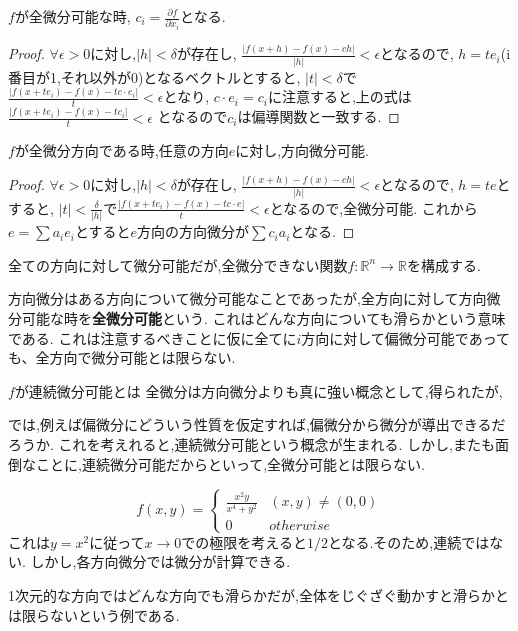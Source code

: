 \begin{prop}
  $f$が全微分可能な時,
  $c_i = \frac{\partial f}{\partial x_i}$となる.
\end{prop}
\begin{proof}
$\forall \epsilon >0$に対し,$|h| < \delta$が存在し,
$\frac{|f(x+h)-f(x) - ch|}{|h|} < \epsilon$となるので,
$h = te_i$(i番目が1,それ以外が0)となるベクトルとすると,
$|t| < \delta$で$\frac{|f(x+te_i)-f(x) - tc\cdot e_i|}{t} < \epsilon$となり,
$c \cdot e_i = c_i$に注意すると,上の式は$\frac{|f(x+te_i)-f(x) - tc_i|}{t} < \epsilon$
となるので$c_i$は偏導関数と一致する.
\end{proof}


\begin{prop}
  $f$が全微分方向である時,任意の方向$e$に対し,方向微分可能.
\end{prop}
\begin{proof}
$\forall \epsilon >0$に対し,$|h| < \delta$が存在し,
$\frac{|f(x+h)-f(x) - ch|}{|h|} < \epsilon$となるので,
$h = te$とすると,
$|t| < \frac{\delta}{|h|}$で$\frac{|f(x+te_i)-f(x) - tc \cdot e|}{t} < \epsilon$となるので,全微分可能.
これから$e = \sum a_i e_i$とすると$e$方向の方向微分が$\sum c_i a_i$となる.
\end{proof}

\begin{epl}
全ての方向に対して微分可能だが,全微分できない関数$f:\mathbb{R}^n \to \mathbb{R}$を構成する.
\end{epl}
方向微分はある方向について微分可能なことであったが,全方向に対して方向微分可能な時を\textbf{全微分可能}という.
これはどんな方向についても滑らかという意味である.
これは注意するべきことに仮に全てに$i$方向に対して偏微分可能であっても、全方向で微分可能とは限らない.

$f$が連続微分可能とは
全微分は方向微分よりも真に強い概念として,得られたが,

では,例えば偏微分にどういう性質を仮定すれば,偏微分から微分が導出できるだろうか.
これを考えれると,連続微分可能という概念が生まれる.
しかし,またも面倒なことに,連続微分可能だからといって,全微分可能とは限らない.
\begin{epl}
  \begin{equation*}
   f(x, y)  = \begin{cases}
   \frac{x^2y}{x^4 + y^2} & (x,y)\neq (0, 0) \\
    0 & otherwise
 \end{cases}
\end{equation*}
これは$y = x^2$に従って$x \to 0$での極限を考えると$1/2$となる.そのため,連続ではない.
しかし,各方向微分では微分が計算できる.
\end{epl}
\begin{rem}
1次元的な方向ではどんな方向でも滑らかだが,全体をじぐざぐ動かすと滑らかとは限らないという例である.
\end{rem}

